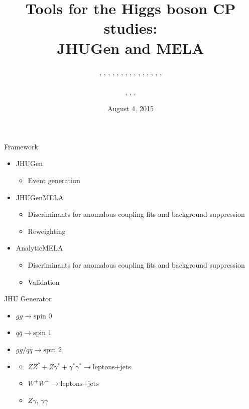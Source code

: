 \documentclass[usenames,dvipsnames,svgnames,table]{beamer}
\title[JHUGen and MELA]{Tools for the Higgs boson CP studies: \\ JHUGen and MELA}
\author[Heshy Roskes]{\CMS{I. Anderson}, \dontknow{S. Bolognesi}, \theory{F. Caola}, \ATLAS{Y. Gao}, \CMS{A. Gritsan}, \dontknow{Z. Guo}, \CMS{C. Martin}, \theory{K. Melnikov}, \me{H. Roskes}, \CMS{U. Sarica}, \theory{M. Schulze}, \CMS{N. Tran}, \CMS{A. Whitbeck}, \CMS{M. Xiao}, \CMS{C. You}, \theory{Y. Zhou}
\texorpdfstring{\\ \leavevmode
\\
\ATLAS{ATLAS}, \CMS{CMS}, \theory{theory}, \dontknow{?}}{}}
\date{August 4, 2015}
\newcommand{\spin}[1]{\text{spin }#1}
\begin{document}
\begin{frame}
\titlepage
\end{frame}

\begin{frame}{Framework}

\begin{itemize}
\small
\item JHUGen
\begin{itemize}
\item Event generation
\end{itemize}
\item JHUGenMELA
\begin{itemize}
\item Discriminants for anomalous coupling fits and background suppression
\item Reweighting
\end{itemize}
\item AnalyticMELA
\begin{itemize}
\item Discriminants for anomalous coupling fits and background suppression
\item Validation
\end{itemize}
\end{itemize}

\end{frame}


\begin{frame}{JHU Generator}
\begin{itemize}
\item $gg\to\spin{0}$
\item $q\bar{q}\to\spin{1}$
\item $gg/q\bar{q}\to\spin{2}$
\end{itemize}
\begin{itemize}
\item
\begin{itemize}[label={$\to$}]
\item $ZZ^*+Z\gamma^*+\gamma^*\gamma^*\to \text{leptons+jets}$
\item $W^+W^-\to \text{leptons+jets}$
\item $Z\gamma$, $\gamma\gamma$
\end{itemize}
\end{itemize}
\end{frame}
\end{document}
